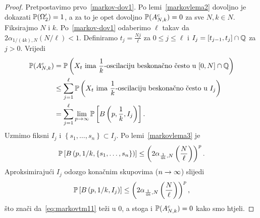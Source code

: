 \documentclass[main.tex]{subfiles}
\begin{document}
\begin{proof}
	Pretpostavimo prvo~\eqref{markov-dov1}. Po lemi~\ref{markovlema2} dovoljno je dokazati
	\( \P(\Omega_2') = 1 \), a za to je opet dovoljno \( \P(A_{N,k}^c) = 0 \) za sve \( N, k \in N \).
	Fiksirajmo \( N \) i \( k \). Po~\eqref{markov-dov1} odaberimo \( \ell \)
	takav da \( 2\alpha_{1/(4k), N}(N/\ell) < 1 \). Definiramo \( t_j = \frac{Nj}\ell \) za \( 0 \le j \le \ell \) i \( I_j = \left[ t_{j-1}, t_j \right] \cap \Q \) za \( j > 0 \). Vrijedi
	\begin{align}
		\P(A_{N,k}^c) & = \P\left( X_t \text{\ ima\ } \frac 1k \text{-oscilaciju beskonačno često u\ } [0,N]\cap \Q \right)            \\
		              & \le \sum_{j=1}^\ell \P\left( X_t \text{\ ima\ } \frac 1k \text{-oscilaciju beskonačno često u\  } I_j \right)  \\
		              & =\sum_{j=1}^\ell \lim\limits_{p \ub} \P \left[ B\left( p, \frac 1k, I_j \right) \right]. \label{eq:markovtm11}
	\end{align}
	Uzmimo fiksni \( I_j \) i \( \left\{ s_1, \ldots, s_n \right\} \subset I_j \). Po lemi~\ref{markovlema3} je
	\begin{equation}
		\P\left[ B\left(p, 1/k, \left\{ s_1, \ldots, s_n  \right\}\right) \right] \le
		\left( 2\alpha_{\frac 1{4k}, N} \left( \frac N\ell \right)  \right)^p.
	\end{equation}
	Aproksimirajući \( I_j \) odozgo konačnim skupovima (\( n \ub \)) slijedi
	\begin{equation}
		\P\left[ B\left(p, 1/k, I_j\right) \right] \le
		\left( 2\alpha_{\frac 1{4k}, N} \left( \frac N\ell \right)  \right)^p,
	\end{equation}
	što znači da~\eqref{eq:markovtm11} teži u \( 0 \), a stoga i \( \P(A_{N,k}^c)=0 \) kako smo htjeli.


\end{proof}
\end{document}
